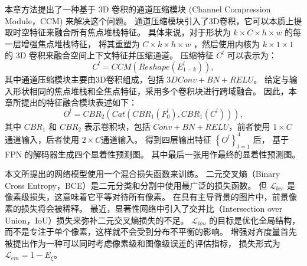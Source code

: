 本章方法提出了一种基于 3D 卷积的通道压缩模块 (Channel Compression Module，CCM) 来解决这个问题。 
通道压缩模块引入了3D卷积，它可以本质上提取时空特征来融合所有焦点堆栈特征。
具体来说，对于形状为 $ k \times C \times h \times w $ 的每一层增强焦点堆栈特征，
将其重塑为 $ C \times  k \times  h \times w $ ，然后使用内核为 $ k \times 1 \times 1 $  的 3D 卷积来融合空间上下文特征并压缩通道。 压缩特征 $ C^{l} $ 可以表示为：
%
%
\begin{equation}
	C^{l} = CCM \left ( Reshape \left ( E_{1-k}^{l} \right ) \right ) ,
\end{equation}
%
%
其中通道压缩模块主要由3D卷积组成，包括 $3DConv+BN+RELU$。 给定与输入形状相同的焦点堆栈和全焦点特征，采用多个卷积块进行跨域融合。 因此，本章所提出的特征融合模块表述如下：
%
%
%	
\begin{equation}
	O^{l}=CBR_{2}\left (Cat \left (CBR_{1} \left (F_{0}^{l} \right ),CBR_{1} \left (C^{l} \right ) \right ) \right ),
\end{equation}
%
%
其中 $CBR_{1}$ 和 $CBR_{2}$ 表示卷积块，包括 $Conv+BN+RELU$，前者使用 $1 \times C$ 通道输入，后者使用 $2 \times C$通道输入。
得到四层输出特征 $\left \{ O^{l} \right \}_{l=1}^{4} $ 后， 基于 FPN 的解码器生成四个显着性预测图。 
其中最后一张用作最终的显着性预测图。 
%
%
%
%
%










本文所提出的网络模型使用一个混合损失函数来训练。
二元交叉熵（Binary Cross Entropy，BCE）是二元分类和分割中使用最广泛的损失函数。 但 $\mathcal L_{bce} $ 是像素级损失，这意味着它平等对待所有像素。
在具有主导背景的图片中，前景像素的损失将会被稀释。 最近，显著性网络中引入了交并比（Intersection over Union，IoU）损失来弥补二元交叉熵损失的不足。
$ \mathcal L_{iou} $ 的目标是优化全局结构，而不是专注于单个像素，这样就不会受到分布不平衡的影响。 增强对齐度量首先被提出作为一种可以同时考虑像素级和图像级误差的评估指标，
损失形式为 $ \mathcal L_{em} = 1 - E_{\xi} $。 


